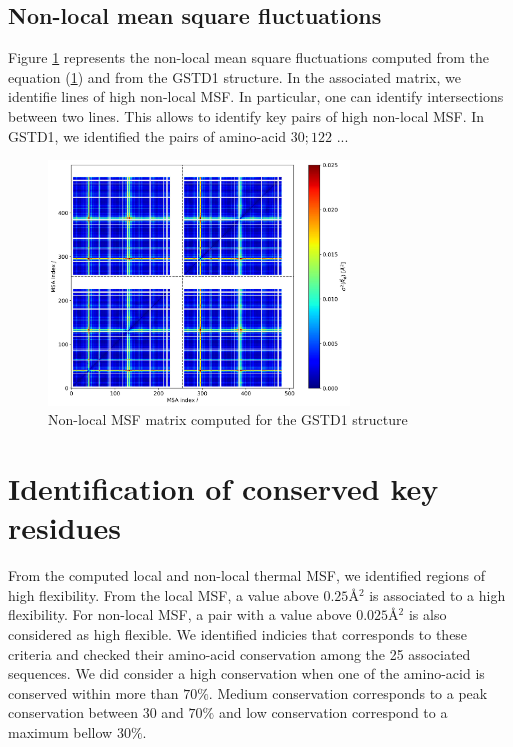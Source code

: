 \subsection{Non-local mean square fluctuations}

Figure \ref{Non-local MSF GSTD1} represents the non-local mean square fluctuations computed from the equation (\ref{}) and from the GSTD1 structure. In the associated matrix, we identifie lines of high non-local MSF. In particular, one can identify intersections between two lines. This allows to identify key pairs of high non-local MSF. In GSTD1, we identified the pairs of amino-acid $30;122$ ... 
\begin{figure}
	\label{Non-local MSF GSTD1}
	\includegraphics[width = 8cm]{figures/ANM-COM+MSA_GSTD1_APO_non-local_MSF}
	\caption{Non-local MSF matrix computed for the GSTD1 structure}
\end{figure}

\section{Identification of conserved key residues}

From the computed local and non-local thermal MSF, we identified regions of high flexibility. From the local MSF, a value above $0.25$\AA$^2$ is associated to a high flexibility. For non-local MSF, a pair with a value above $0.025$\AA$^2$ is also considered as high flexible. We identified indicies that corresponds to these criteria and checked their amino-acid conservation among the 25 associated sequences. We did consider a high conservation when one of the amino-acid is conserved within more than $70\%$. Medium conservation corresponds to a peak conservation between $30$ and $70\%$ and low conservation correspond to a maximum bellow $30\%$.

